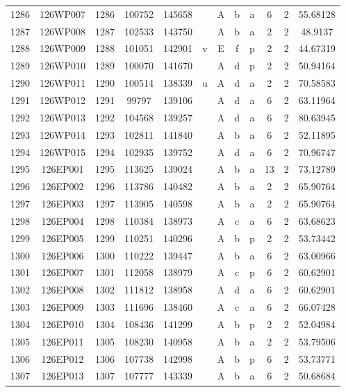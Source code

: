 \begin{tabular}{|*{12}{c|}}
1286 & 126WP007 & 1286 & 100752 & 145658 &  & A & b & a & 6 & 2 & 55.68128 \\ 
1287 & 126WP008 & 1287 & 102533 & 143750 &  & A & b & a & 2 & 2 & 48.9137 \\ 
1288 & 126WP009 & 1288 & 101051 & 142901 & v & E & f & p & 2 & 2 & 44.67319 \\ 
1289 & 126WP010 & 1289 & 100070 & 141670 &  & A & d & p & 2 & 2 & 50.94164 \\ 
1290 & 126WP011 & 1290 & 100514 & 138339 & u & A & d & a & 2 & 2 & 70.58583 \\ 
1291 & 126WP012 & 1291 & 99797 & 139106 &  & A & d & a & 6 & 2 & 63.11964 \\ 
1292 & 126WP013 & 1292 & 104568 & 139257 &  & A & d & a & 6 & 2 & 80.63945 \\ 
1293 & 126WP014 & 1293 & 102811 & 141840 &  & A & b & a & 6 & 2 & 52.11895 \\ 
1294 & 126WP015 & 1294 & 102935 & 139752 &  & A & d & a & 6 & 2 & 70.96747 \\ 
1295 & 126EP001 & 1295 & 113625 & 139024 &  & A & b & a & 13 & 2 & 73.12789 \\ 
1296 & 126EP002 & 1296 & 113786 & 140482 &  & A & b & a & 2 & 2 & 65.90764 \\ 
1297 & 126EP003 & 1297 & 113905 & 140598 &  & A & b & a & 2 & 2 & 65.90764 \\ 
1298 & 126EP004 & 1298 & 110384 & 138973 &  & A & c & a & 6 & 2 & 63.68623 \\ 
1299 & 126EP005 & 1299 & 110251 & 140296 &  & A & b & p & 2 & 2 & 53.73442 \\ 
1300 & 126EP006 & 1300 & 110222 & 139447 &  & A & b & a & 6 & 2 & 63.00966 \\ 
1301 & 126EP007 & 1301 & 112058 & 138979 &  & A & c & p & 6 & 2 & 60.62901 \\ 
1302 & 126EP008 & 1302 & 111812 & 138958 &  & A & d & a & 6 & 2 & 60.62901 \\ 
1303 & 126EP009 & 1303 & 111696 & 138460 &  & A & c & a & 6 & 2 & 66.07428 \\ 
1304 & 126EP010 & 1304 & 108436 & 141299 &  & A & b & p & 2 & 2 & 52.04984 \\ 
1305 & 126EP011 & 1305 & 108230 & 140958 &  & A & b & a & 2 & 2 & 53.79506 \\ 
1306 & 126EP012 & 1306 & 107738 & 142998 &  & A & b & p & 6 & 2 & 53.73771 \\ 
1307 & 126EP013 & 1307 & 107777 & 143339 &  & A & b & a & 6 & 2 & 50.68684 \\ 

\end{tabular}
